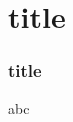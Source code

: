 \documentclass{beamer}
\begin{document}
\section{title}
\begin{frame}
\frametitle{title}
	abc
\end{frame}	
	
\end{document}
